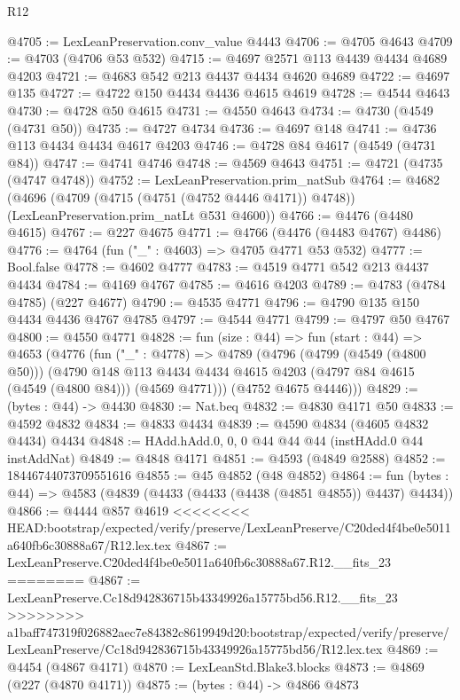 \begin{lexlean}{R12}
\begin{coremodule}
{{{{{{{{{{{{{{{{{{{{{{{{{{{{{{{{{{{{{{{{{{{{{{{{{{{{{{{{{{{{{{{{{{{{{{{{{{{{{{{{{{{{{{{{{{{{{{{{{{{{{{{{{{@4705 := LexLeanPreservation.conv_value @4443
@4706 := @4705 @4643
@4709 := @4703 (@4706 @53 @532)
@4715 := @4697 @2571 @113 @4439 @4434 @4689 @4203
@4721 := @4683 @542 @213 @4437 @4434 @4620 @4689
@4722 := @4697 @135
@4727 := @4722 @150 @4434 @4436 @4615 @4619
@4728 := @4544 @4643
@4730 := @4728 @50 @4615
@4731 := @4550 @4643
@4734 := @4730 (@4549 (@4731 @50))
@4735 := @4727 @4734
@4736 := @4697 @148
@4741 := @4736 @113 @4434 @4434 @4617 @4203
@4746 := @4728 @84 @4617 (@4549 (@4731 @84))
@4747 := @4741 @4746
@4748 := @4569 @4643
@4751 := @4721 (@4735 (@4747 @4748))
@4752 := LexLeanPreservation.prim_natSub
@4764 := @4682
    (@4696
      (@4709 (@4715 (@4751 (@4752 @4446 @4171)) @4748))
      (LexLeanPreservation.prim_natLt @531 @4600))
@4766 := @4476 (@4480 @4615)
@4767 := @227 @4675
@4771 := @4766 (@4476 (@4483 @4767) @4486)
@4776 := @4764 (fun ("_" : @4603) => @4705 @4771 @53 @532)
@4777 := Bool.false
@4778 := @4602 @4777
@4783 := @4519 @4771 @542 @213 @4437 @4434
@4784 := @4169 @4767
@4785 := @4616 @4203
@4789 := @4783 (@4784 @4785) (@227 @4677)
@4790 := @4535 @4771
@4796 := @4790 @135 @150 @4434 @4436 @4767 @4785
@4797 := @4544 @4771
@4799 := @4797 @50 @4767
@4800 := @4550 @4771
@4828 := fun (size : @44) =>
  fun (start : @44) =>
  @4653
    (@4776
      (fun ("_" : @4778) =>
      @4789
        (@4796
          (@4799 (@4549 (@4800 @50)))
          (@4790
            @148
            @113
            @4434
            @4434
            @4615
            @4203
            (@4797 @84 @4615 (@4549 (@4800 @84)))
            (@4569 @4771)))
        (@4752 @4675 @4446)))
@4829 := (bytes : @44) -> @4430
@4830 := Nat.beq
@4832 := @4830 @4171 @50
@4833 := @4592 @4832
@4834 := @4833 @4434
@4839 := @4590 @4834 (@4605 @4832 @4434) @4434
@4848 := HAdd.hAdd.{0, 0, 0} @44 @44 @44 (instHAdd.{0} @44 instAddNat)
@4849 := @4848 @4171
@4851 := @4593 (@4849 @2588)
@4852 := 18446744073709551616
@4855 := @45 @4852 (@48 @4852)
@4864 := fun (bytes : @44) => @4583 (@4839 (@4433 (@4433 (@4438 (@4851 @4855)) @4437) @4434))
@4866 := @4444 @857 @4619
<<<<<<<< HEAD:bootstrap/expected/verify/preserve/LexLeanPreserve/C20ded4f4be0e5011a640fb6c30888a67/R12.lex.tex
@4867 := LexLeanPreserve.C20ded4f4be0e5011a640fb6c30888a67.R12.__fits_23
========
@4867 := LexLeanPreserve.Cc18d942836715b43349926a15775bd56.R12.__fits_23
>>>>>>>> a1baff747319f026882aec7e84382c8619949d20:bootstrap/expected/verify/preserve/LexLeanPreserve/Cc18d942836715b43349926a15775bd56/R12.lex.tex
@4869 := @4454 (@4867 @4171)
@4870 := LexLeanStd.Blake3.blocks
@4873 := @4869 (@227 (@4870 @4171))
@4875 := (bytes : @44) -> @4866 @4873
}}}}}}}}}}}}}}}}}}}}}}}}}}}}}}}}}}}}}}}}}}}}}}}}}}}}}}}}}}}}}}}}}}}}}}}}}}}}}}}}}}}}}}}}}}}}}}}}}}}}}}}}}}
\end{coremodule}
\end{lexlean}
